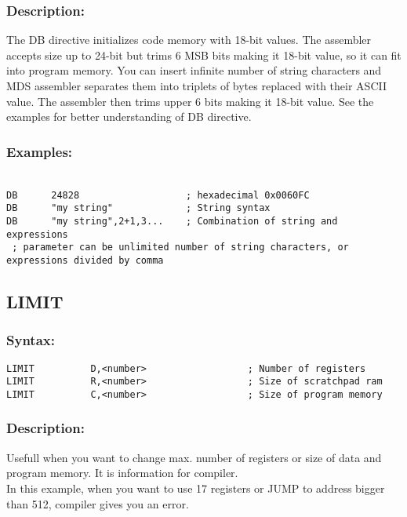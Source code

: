         \subsubsection{Description:}
            The DB directive initializes code memory with 18-bit values. The assembler accepts size up to 24-bit but trims 6 MSB bits making it 18-bit value,
            so it can fit into program memory. You can insert infinite number of string characters and MDS assembler separates them into triplets of bytes replaced
            with their ASCII value. The assembler then trims upper 6 bits making it 18-bit value.
            See the examples for better understanding of DB directive.

        \subsubsection{Examples:}
        {
            ~\\
            \usecodefont
            \verb'DB      24828                   ; hexadecimal 0x0060FC'\\
            \verb'DB      "my string"             ; String syntax'\\
            \verb'DB      "my string",2+1,3...    ; Combination of string and expressions'\\
            \verb' ; parameter can be unlimited number of string characters, or expressions divided by comma'\\
        }
    \subsection{LIMIT}

        \subsubsection{Syntax:}
        \verb'LIMIT          D,<number>                  ; Number of registers '\\
        \verb'LIMIT          R,<number>                  ; Size of scratchpad ram '\\
        \verb'LIMIT          C,<number>                  ; Size of program memory '\\

        \subsubsection{Description:}
        Usefull when you want to change max. number of registers or size of  data and program memory. It is information for compiler.\\
        In this example, when you want to use 17 registers or JUMP to address bigger than 512, compiler gives you an error.

